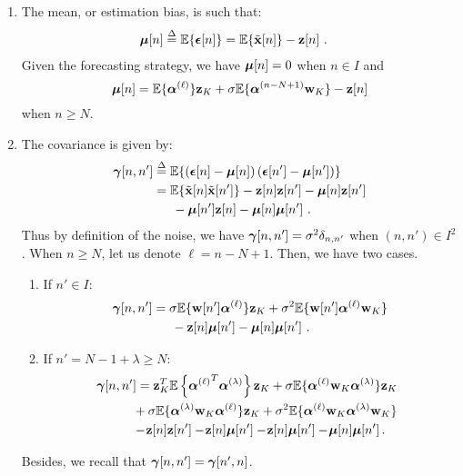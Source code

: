 \begin{enumerate}
\item 
The mean, or estimation bias, is such that: 
\begin{align}
\bmu[n]&\defeq\EE\{\bepsilon[n]\} 
=\EE\{\tilde\bx[n]\} - \bz[n]\ .\label{eq:defn:bias0}
\end{align}
Given the forecasting strategy, we have $\boldsymbol{\mu}[n]=0$ when $n\in I$ and
\begin{equation}
\bmu[n]= \EE\{\balpha^{(\ell)}\}\bz_{K} + \sigma\EE\{\balpha^{(n-N+1)}\bw_{K}\} - \bz[n]
\label{eq:bias0}
\end{equation}
when $n\geq N$.
\item 
The covariance is given by:
\begin{align*}
\boldsymbol{\gamma}[n,n'] &\overset{\Delta}{=} {\mathbb E}\{\left(\boldsymbol{\epsilon}[n]-\boldsymbol{\mu}[n]\right)\left(\boldsymbol{\epsilon}[n']-\boldsymbol{\mu}[n']\right)\}\\
&= {\mathbb E}\{\tilde{{\mathbf x}}[n]\tilde{{\mathbf x}}[n']\}-{\mathbf z}[n]{\mathbf z}[n'] -\boldsymbol{\mu}[n]{\mathbf z}[n'] \\
&\hspace{15pt} - \boldsymbol{\mu}[n']{\mathbf z}[n] -\boldsymbol{\mu}[n]\boldsymbol{\mu}[n']\ .
\end{align*}
Thus by definition of the noise, we have $\boldsymbol{\gamma}[n,n'] =\sigma^2\delta_{n,n'}$ when $(n,n')\in I^2$. When $n\geq N$, let us denote $\ell=n-N+1$. Then, we have two cases.
\begin{enumerate}[label=(\roman*)]
\item If $n'\in I$:
\begin{align}
\nonumber
\bgamma[n,n'] &= \sigma\EE\{\bw[n']\balpha^{(\ell)}\}\bz_K + \sigma^2\EE\{\bw[n']\balpha^{(\ell)}\bw_K\} \\
&\hspace{15pt} -\bz[n]\bmu[n'] - \bmu[n]\bmu[n']\ .
\label{eq:cov00}
\end{align}
\item If $n'=N-1+\lambda\geq N$:
\begin{align}
\nonumber
\hspace{-6pt}\bgamma[n,n'] &= \bz_K^T\EE\left\{{\balpha^{(\ell)}}^T\balpha^{(\lambda)}\right\}\bz_K + \sigma\EE\{\balpha^{(\ell)}\bw_K\balpha^{(\lambda)}\}\bz_K \\
\nonumber
&\hspace{-3pt} + \sigma\EE\{\balpha^{(\lambda)}\bw_K\balpha^{(\ell)}\}\bz_K + \sigma^2\EE\{\balpha^{(\ell)}\bw_K\balpha^{(\lambda)}\bw_K\}  \\
&\hspace{-3pt} -\!\bz[n]\bz[n']-\!\bz[n]\bmu[n']-\!\bz[n]\bmu[n'] -\! \bmu[n]\bmu[n']\,.
\label{eq:cov01}
\end{align}
\end{enumerate}
Besides, we recall that $\boldsymbol{\gamma}[n,n']=\boldsymbol{\gamma}[n',n]$.
\end{enumerate}

